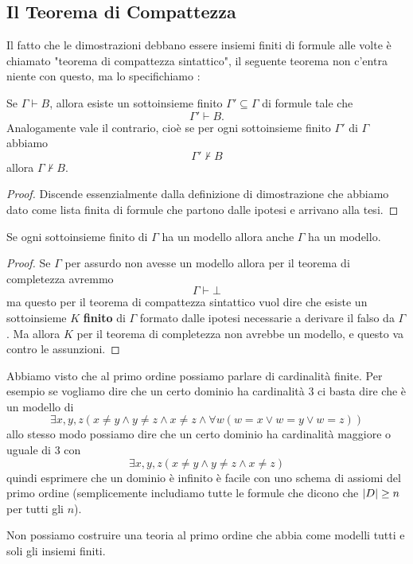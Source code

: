 \documentclass[11pt]{scrartcl}
\begin{document}
 	\subsection{Il Teorema di Compattezza}
 	Il fatto che le dimostrazioni debbano essere insiemi finiti di formule alle volte è chiamato "teorema di compattezza sintattico", il seguente teorema non c'entra niente con questo, ma lo specifichiamo :
 	\begin{theorem}
 		Se $\Gamma\vdash B$, allora esiste un sottoinsieme finito $\Gamma'\subseteq\Gamma$ di formule tale che
 		$$\Gamma'\vdash B.$$
 		Analogamente vale il contrario, cioè se per ogni sottoinsieme finito $\Gamma'$ di $\Gamma$ abbiamo
 		$$\Gamma'\not\vdash B$$
 		allora $\Gamma\not\vdash B$.
 	\end{theorem}
 	\begin{proof}
 		Discende essenzialmente dalla definizione di dimostrazione che abbiamo dato come lista finita di formule che partono dalle ipotesi e arrivano alla tesi.
 	\end{proof}
 	\begin{theorem}
 		Se ogni sottoinsieme finito di $\Gamma$ ha un modello allora anche $\Gamma$ ha un modello.
 	\end{theorem}
 	\begin{proof}
 		Se $\Gamma$ per assurdo non avesse un modello allora per il teorema di completezza avremmo
 		$$\Gamma\vdash \bot$$
 		ma questo per il teorema di compattezza sintattico vuol dire che esiste un sottoinsieme $K$ \textbf{finito} di $\Gamma$ formato dalle ipotesi necessarie a derivare il falso da $\Gamma$. Ma allora $K$ per il teorema di completezza non avrebbe un modello, e questo va contro le assunzioni.
 	\end{proof}
 	Abbiamo visto che al primo ordine possiamo parlare di cardinalità finite. Per esempio se vogliamo dire che un certo dominio ha cardinalità $3$ ci basta dire che è un modello di
 	$$\exists x,y,z\left(x\ne y\land y\ne z \land x\ne z \land \forall w \left(w= x \lor w=y \lor w=z\right)\right)$$
 	allo stesso modo possiamo dire che un certo dominio ha cardinalità maggiore o uguale di $3$ con
 	$$\exists x,y,z\left(x \ne y \land y\ne z \land x\ne z\right)$$
 	quindi esprimere che un dominio è infinito è facile con uno schema di assiomi del primo ordine (semplicemente includiamo tutte le formule che dicono che $\left\lvert D \right\rvert\ge n$ per tutti gli $n$). \\
 	\begin{proposition}
 		Non possiamo costruire una teoria al primo ordine che abbia come modelli tutti e soli gli insiemi finiti.
 	\end{proposition}
\end{document}
